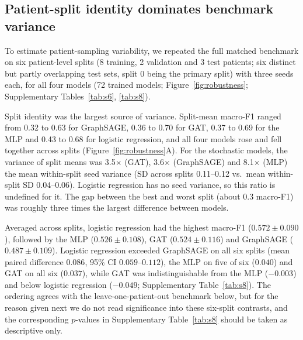 \documentclass[11pt,letterpaper]{article}
\begin{document}
\subsection{Patient-split identity dominates benchmark variance}

To estimate patient-sampling variability, we repeated the full matched benchmark on six patient-level splits (8 training, 2 validation and 3 test patients; six distinct but partly overlapping test sets, split 0 being the primary split) with three seeds each, for all four models (72 trained models; Figure~\ref{fig:robustness}; Supplementary Tables~\ref{tab:s6}, \ref{tab:s8}).

Split identity was the largest source of variance. Split-mean macro-F1 ranged from 0.32 to 0.63 for GraphSAGE, 0.36 to 0.70 for GAT, 0.37 to 0.69 for the MLP and 0.43 to 0.68 for logistic regression, and all four models rose and fell together across splits (Figure~\ref{fig:robustness}A). For the stochastic models, the variance of split means was 3.5$\times$ (GAT), 3.6$\times$ (GraphSAGE) and 8.1$\times$ (MLP) the mean within-split seed variance (SD across splits 0.11--0.12 vs.\ mean within-split SD 0.04--0.06). Logistic regression has no seed variance, so this ratio is undefined for it. The gap between the best and worst split (about 0.3 macro-F1) was roughly three times the largest difference between models.

Averaged across splits, logistic regression had the highest macro-F1 ($0.572 \pm 0.090$), followed by the MLP ($0.526 \pm 0.108$), GAT ($0.524 \pm 0.116$) and GraphSAGE ($0.487 \pm 0.109$). Logistic regression exceeded GraphSAGE on all six splits (mean paired difference $0.086$, 95\% CI $0.059$--$0.112$), the MLP on five of six ($0.040$) and GAT on all six ($0.037$), while GAT was indistinguishable from the MLP ($-0.003$) and below logistic regression ($-0.049$; Supplementary Table~\ref{tab:s8}). The ordering agrees with the leave-one-patient-out benchmark below, but for the reason given next we do not read significance into these six-split contrasts, and the corresponding $p$-values in Supplementary Table~\ref{tab:s8} should be taken as descriptive only.
\end{document}
